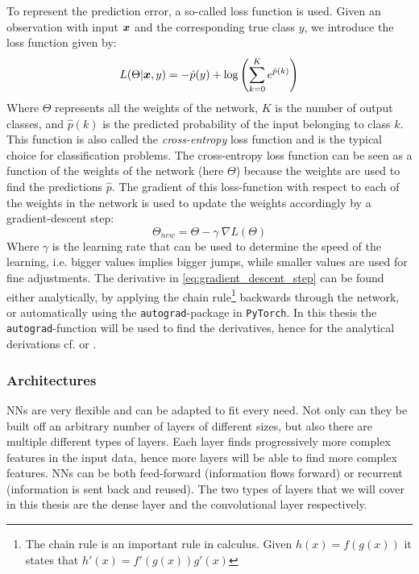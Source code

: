 To represent the prediction error, a so-called loss function is used. Given an observation with input $\boldsymbol{x}$ and the corresponding true class $y$, we introduce the loss function given by:
\begin{equation}
    L(\Theta | \boldsymbol{x},y) = - \hat{p}(y) + \log\left(\sum_{k=0}^K e^{\hat{p}(k)}\right)
\end{equation}
Where $\Theta$ represents all the weights of the network, $K$ is the number of output classes, and $\hat{p}(k)$ is the predicted probability of the input belonging to class $k$. This function is also called the \textit{cross-entropy} loss function and is the typical choice for classification problems. The cross-entropy loss function can be seen as a function of the weights of the network (here $\Theta$) because the weights are used to find the predictions $\hat{p}$. The gradient of this loss-function with respect to each of the weights in the network is used to update the weights accordingly by a gradient-descent step:
\begin{equation}
    \Theta_{new} = \Theta - \gamma \ \nabla L (\Theta)
    \label{eq:gradient_descent_step}
\end{equation}
Where $\gamma$ is the learning rate that can be used to determine the speed of the learning, i.e. bigger values implies bigger jumps, while smaller values are used for fine adjustments. The derivative in \eqref{eq:gradient_descent_step} can be found either analytically, by applying the chain rule\footnote{The chain rule is an important rule in calculus. Given $h(x) = f(g(x))$ it states that $h'(x) = f'(g(x))g'(x)$} backwards through the network, or automatically using the \texttt{autograd}-package in \texttt{PyTorch}. In this thesis the \texttt{autograd}-function will be used to find the derivatives, hence for the analytical derivations cf. \cite{elements_NN} or \cite{Zhang2016}.

\subsubsection{Architectures}
NNs are very flexible and can be adapted to fit every need. Not only can they be built off an arbitrary number of layers of different sizes, but also there are multiple different types of layers. Each layer finds progressively more complex features in the input data, hence more layers will be able to find more complex features. NNs can be both feed-forward (information flows forward) or recurrent (information is sent back and reused). The two types of layers that we will cover in this thesis are the dense layer and the convolutional layer respectively.

